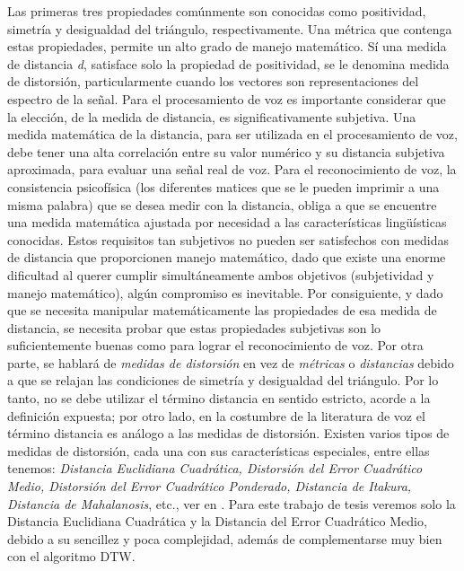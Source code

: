 \begin{enumerate}
Las primeras tres propiedades comúnmente son conocidas como positividad, simetría y desigualdad del triángulo, respectivamente. Una métrica que contenga estas propiedades, permite un alto grado de manejo matemático. Sí una medida de distancia \textit{d}, satisface solo la propiedad de positividad, se le denomina medida de distorsión, particularmente cuando los vectores son representaciones del espectro de la señal.
\vskip 0.5cm
Para el procesamiento de voz es importante considerar que la elección, de la medida de distancia, es significativamente subjetiva. Una medida matemática de la distancia, para ser utilizada en el procesamiento de voz, debe tener una alta correlación entre su valor numérico y su distancia subjetiva aproximada, para evaluar una señal real de voz. 
\vskip 0.5cm
Para el reconocimiento de voz, la consistencia psicofísica (los diferentes matices que se le pueden imprimir a una misma palabra) que se desea medir con la distancia, obliga a que se encuentre una medida matemática ajustada por necesidad a las características lingüísticas conocidas. Estos requisitos tan subjetivos no pueden ser satisfechos con medidas de distancia que proporcionen manejo matemático, dado que existe una enorme dificultad al querer cumplir simultáneamente ambos objetivos (subjetividad y manejo matemático), algún compromiso es inevitable. Por consiguiente, y dado que se necesita manipular matemáticamente las propiedades de esa medida de distancia, se necesita probar que estas propiedades subjetivas son lo suficientemente buenas como para lograr el reconocimiento de voz. 
\vskip 0.5cm
Por otra parte, se hablará de \textit{medidas de distorsión} en vez de \textit{métricas} o \textit{distancias} debido a que se relajan las condiciones de simetría y desigualdad del triángulo. Por lo tanto, no se debe utilizar el término distancia en sentido estricto, acorde a la definición expuesta; por otro lado, en la costumbre de la literatura de voz el término distancia es análogo a las medidas de distorsión.
\vskip 0.5cm
Existen varios tipos de medidas de distorsión, cada una con sus características especiales, entre ellas tenemos: \textit{Distancia Euclidiana Cuadrática, Distorsión del Error Cuadrático Medio, Distorsión del Error Cuadrático Ponderado, Distancia de Itakura, Distancia de Mahalanosis}, etc., ver en \citep{navarrete}.
\vskip 0.5cm
Para este trabajo de tesis veremos solo la Distancia Euclidiana Cuadrática y la Distancia del Error Cuadrático Medio, debido a su sencillez y poca complejidad, además de complementarse muy bien con el algoritmo DTW.


\end{enumerate}
